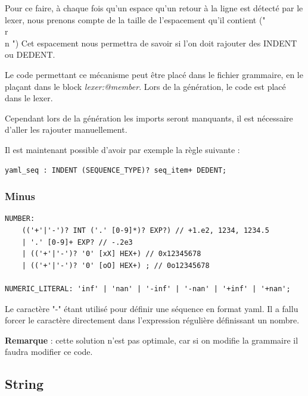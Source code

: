 \documentclass[
    iict, %
    il, %
]{heig-tb}
\begin{document}
Pour ce faire, à chaque fois qu'un espace qu'un retour à la ligne est détecté par le lexer, nous prenons compte de la taille de l'espacement qu'il contient ("\\r\\n    ")
Cet espacement nous permettra de savoir si l'on doit rajouter des INDENT ou DEDENT.

Le code permettant ce mécanisme peut être placé dans le fichier grammaire, en le plaçant dans le block \emph{lexer:@member{}}.
Lors de la génération, le code est placé dans le lexer.

Cependant lors de la génération les imports seront manquants, il est nécessaire d'aller les rajouter manuellement.



Il est maintenant possible d'avoir par exemple la règle suivante :

\begin{lstlisting}[frame=single,caption={generator-code},label={generator-code}]
    yaml_seq : INDENT (SEQUENCE_TYPE)? seq_item+ DEDENT;
\end{lstlisting}

\subsubsection{Minus}
\begin{lstlisting}[frame=single,caption={uon-number},label={uon-number}]
NUMBER:
	(('+'|'-')? INT ('.' [0-9]*)? EXP?) // +1.e2, 1234, 1234.5
	| '.' [0-9]+ EXP? // -.2e3
	| (('+'|'-')? '0' [xX] HEX+) // 0x12345678
	| (('+'|'-')? '0' [oO] HEX+) ; // 0o12345678

NUMERIC_LITERAL: 'inf' | 'nan' | '-inf' | '-nan' | '+inf' | '+nan';
\end{lstlisting}

Le caractère "-" étant utilisé pour définir une séquence en format yaml.
Il a fallu forcer le caractère directement dans l'expression régulière définissant un nombre.

\textbf{Remarque} : cette solution n'est pas optimale, car si on modifie la grammaire il faudra modifier ce code.

\subsection{String}
\end{document}
